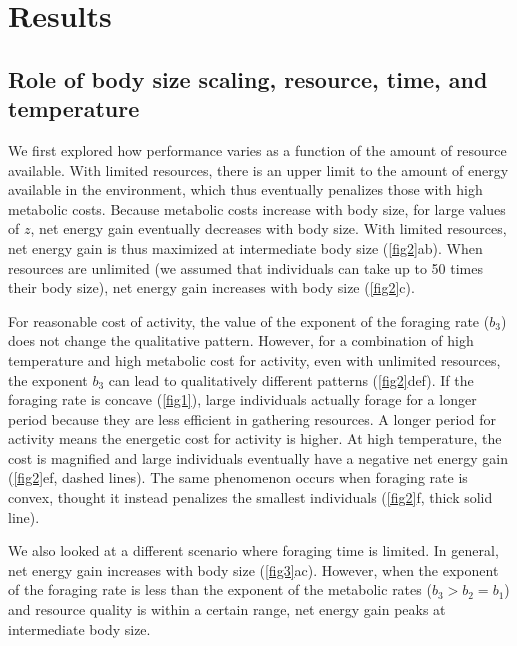 \section*{Results}
\subsection*{Role of body size scaling, resource, time, and temperature}
We first explored how performance varies as a function of the amount of resource available.
With limited resources,  there is an upper limit to the amount of energy available in the environment, which thus eventually penalizes those with high metabolic costs.
Because metabolic costs increase with  body size, for large values of $z$, net energy gain eventually decreases with body size. 
With limited resources, net energy gain is thus maximized at intermediate body size (\cref{fig2}ab). 
 When resources are unlimited (we assumed that individuals can take up to 50 times their body size), net energy gain increases with body size (\cref{fig2}c).

For reasonable cost of activity, the value of the exponent of the foraging rate ($b_3$) does not change the qualitative pattern.
However,  for a combination of high temperature and high metabolic cost for activity, even with unlimited resources, the exponent $b_3$ can lead to qualitatively different patterns   (\cref{fig2}def).
If the foraging rate is concave (\cref{fig1}), large individuals actually forage for a longer period because they are less efficient in gathering resources.
A longer period for  activity means the energetic cost for activity is higher.
At high temperature, the cost is magnified and  large individuals eventually have a negative net energy gain (\cref{fig2}ef, dashed lines).
The same phenomenon occurs when foraging rate is convex, thought it instead penalizes the smallest individuals (\cref{fig2}f, thick solid line).

We also looked at a different scenario where foraging time is limited.
In general, net energy gain increases with body size (\cref{fig3}ac).
However, when the exponent of the foraging rate is less than the exponent of the metabolic rates ($b_3 > b_2 = b_1$) and resource quality is within a certain range,  net energy gain peaks at intermediate body size.

